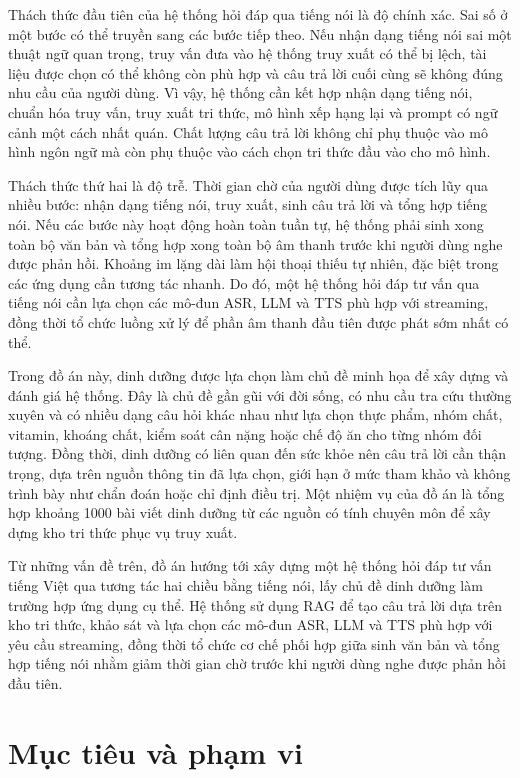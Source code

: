 \documentclass[a4paper,13pt,twoside]{report}
\begin{document}
Thách thức đầu tiên của hệ thống hỏi đáp qua tiếng nói là độ chính xác. Sai số ở một bước có thể truyền sang các bước tiếp theo. Nếu nhận dạng tiếng nói sai một thuật ngữ quan trọng, truy vấn đưa vào hệ thống truy xuất có thể bị lệch, tài liệu được chọn có thể không còn phù hợp và câu trả lời cuối cùng sẽ không đúng nhu cầu của người dùng. Vì vậy, hệ thống cần kết hợp nhận dạng tiếng nói, chuẩn hóa truy vấn, truy xuất tri thức, mô hình xếp hạng lại và prompt có ngữ cảnh một cách nhất quán. Chất lượng câu trả lời không chỉ phụ thuộc vào mô hình ngôn ngữ mà còn phụ thuộc vào cách chọn tri thức đầu vào cho mô hình.

Thách thức thứ hai là độ trễ. Thời gian chờ của người dùng được tích lũy qua nhiều bước: nhận dạng tiếng nói, truy xuất, sinh câu trả lời và tổng hợp tiếng nói. Nếu các bước này hoạt động hoàn toàn tuần tự, hệ thống phải sinh xong toàn bộ văn bản và tổng hợp xong toàn bộ âm thanh trước khi người dùng nghe được phản hồi. Khoảng im lặng dài làm hội thoại thiếu tự nhiên, đặc biệt trong các ứng dụng cần tương tác nhanh. Do đó, một hệ thống hỏi đáp tư vấn qua tiếng nói cần lựa chọn các mô-đun ASR, LLM và TTS phù hợp với streaming, đồng thời tổ chức luồng xử lý để phần âm thanh đầu tiên được phát sớm nhất có thể.

Trong đồ án này, dinh dưỡng được lựa chọn làm chủ đề minh họa để xây dựng và đánh giá hệ thống. Đây là chủ đề gần gũi với đời sống, có nhu cầu tra cứu thường xuyên và có nhiều dạng câu hỏi khác nhau như lựa chọn thực phẩm, nhóm chất, vitamin, khoáng chất, kiểm soát cân nặng hoặc chế độ ăn cho từng nhóm đối tượng. Đồng thời, dinh dưỡng có liên quan đến sức khỏe nên câu trả lời cần thận trọng, dựa trên nguồn thông tin đã lựa chọn, giới hạn ở mức tham khảo và không trình bày như chẩn đoán hoặc chỉ định điều trị. Một nhiệm vụ của đồ án là tổng hợp khoảng 1000 bài viết dinh dưỡng từ các nguồn có tính chuyên môn để xây dựng kho tri thức phục vụ truy xuất.

Từ những vấn đề trên, đồ án hướng tới xây dựng một hệ thống hỏi đáp tư vấn tiếng Việt qua tương tác hai chiều bằng tiếng nói, lấy chủ đề dinh dưỡng làm trường hợp ứng dụng cụ thể. Hệ thống sử dụng RAG để tạo câu trả lời dựa trên kho tri thức, khảo sát và lựa chọn các mô-đun ASR, LLM và TTS phù hợp với yêu cầu streaming, đồng thời tổ chức cơ chế phối hợp giữa sinh văn bản và tổng hợp tiếng nói nhằm giảm thời gian chờ trước khi người dùng nghe được phản hồi đầu tiên.

\section{Mục tiêu và phạm vi}
\end{document}
